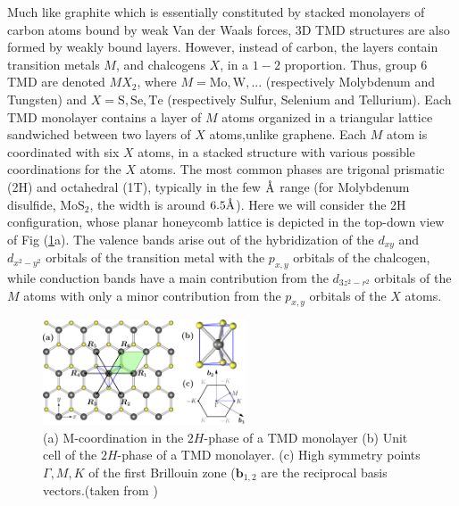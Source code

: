 Much like graphite which is essentially constituted by stacked monolayers of carbon atoms bound by weak Van der Waals forces, 3D TMD structures are also formed by weakly bound layers.
However, instead of carbon, the layers contain transition metals $M$, and chalcogens $X$, in a $1-2$ proportion.
Thus, group 6 TMD are denoted $MX_2$, where $M = \text{Mo}, \text{W}, ...$ (respectively Molybdenum and Tungsten) and $X = \text{S}, \text{Se}, \text{Te}$ (respectively Sulfur, Selenium and Tellurium).
Each TMD monolayer contains a layer of $M$ atoms organized in a triangular lattice sandwiched between two layers of $X$ atoms,unlike graphene.
Each $M$ atom is coordinated with six $X$ atoms, in a stacked structure with various possible coordinations for the $X$ atoms.
The most common phases are trigonal prismatic (2H) and octahedral (1T), typically in the few $\textup{\AA}$ range (for Molybdenum disulfide, $\text{Mo}\text{S}_2$, the width is around $6.5 \textup{\AA}$).
Here we will consider the 2H configuration, whose planar honeycomb lattice is depicted in the top-down view of Fig (\ref{fig:tmdHex}a).
The valence bands arise out of the hybridization of the $d_{xy}$ and $d_{x^2 - y^2}$ orbitals of the transition metal with the $p_{x, y}$ orbitals of the chalcogen, while conduction bands have a main contribution from the $d_{3z^2 - r^2}$ orbitals of the $M$ atoms with only a minor contribution from the $p_{x, y}$ orbitals of the $X$ atoms.
\begin{figure}[H]
\centering
\includegraphics[width = 6cm]{images/tmd2.png}
 \caption{(a) M-coordination in the $2H$-phase of a TMD monolayer
(b) Unit cell of the $2H$-phase of a TMD monolayer.
(c) High symmetry points $\Gamma, M, K$ of the first Brillouin zone ($\bm b_{1,2}$ are the reciprocal basis vectors.(taken from \cite{liu_three-band_2013})}\label{fig:tmdHex}
\end{figure}